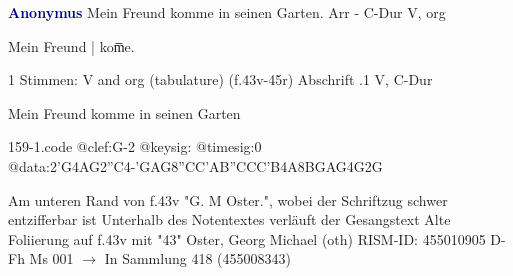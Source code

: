 \documentclass[twocolumn]{book}
\begin{document}
\newline \par \vspace{7pt} \textcolor{darkblue}{\textbf{Anonymus  }}
\newline Mein Freund komme in seinen Garten. Arr - C-Dur
\newline V, org
\newline \begin{itshape}[f.43v, at left:] Mein Freund | kom̅e.\end{itshape} 
\newline \textcolor{darkblue}{}  1 Stimmen: V and org (tabulature)  (f.43v-45r)
\newline Abschrift
.1  V, C-Dur
\newline \begin{footnotesize} Mein Freund komme in seinen Garten \end{footnotesize}  
\begin{filecontents*}{159-1.code}
@clef:G-2
@keysig:
@timesig:0
@data:2'G4AG2''C4-'GAG{8''CC'AB}{''CCC'B}4A{8BG}{AG}4G2G
\end{filecontents*}
\newline
%
\newline Am unteren Rand von f.43v "G. M Oster.", wobei der Schriftzug schwer entzifferbar ist
\newline Unterhalb des Notentextes verläuft der Gesangstext
\newline Alte Foliierung auf f.43v mit "43"
\newline Oster, Georg Michael  (oth)
\newline RISM-ID: 455010905
\newline D-Fh  Ms 001
\newline $\rightarrow$ In Sammlung 418 (455008343)
      
\end{document}
